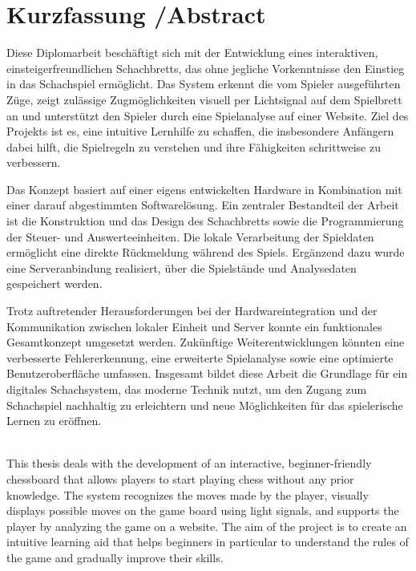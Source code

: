

\chapter*{Kurzfassung /Abstract}
\label{cha:abstract}

Diese Diplomarbeit beschäftigt sich mit der Entwicklung eines interaktiven, einsteigerfreundlichen Schachbretts, 
das ohne jegliche Vorkenntnisse den Einstieg in das Schachspiel ermöglicht. Das System erkennt die vom Spieler 
ausgeführten Züge, zeigt zulässige Zugmöglichkeiten visuell per Lichtsignal auf dem Spielbrett an und unterstützt 
den Spieler durch eine Spielanalyse auf einer Website. Ziel des Projekts ist es, eine intuitive Lernhilfe zu schaffen, 
die insbesondere Anfängern dabei hilft, die Spielregeln zu verstehen und ihre Fähigkeiten schrittweise zu verbessern.

Das Konzept basiert auf einer eigens entwickelten Hardware in Kombination mit einer darauf abgestimmten Softwarelösung. 
Ein zentraler Bestandteil der Arbeit ist die Konstruktion und das Design des Schachbretts sowie die Programmierung der 
Steuer- und Auswerteeinheiten. Die lokale Verarbeitung der Spieldaten ermöglicht eine direkte Rückmeldung während des 
Spiels. Ergänzend dazu wurde eine Serveranbindung realisiert, über die Spielstände und Analysedaten gespeichert werden.

Trotz auftretender Herausforderungen bei der Hardwareintegration und der Kommunikation zwischen lokaler Einheit und 
Server konnte ein funktionales Gesamtkonzept umgesetzt werden. Zukünftige Weiterentwicklungen könnten eine verbesserte 
Fehlererkennung, eine erweiterte Spielanalyse sowie eine optimierte Benutzeroberfläche umfassen. Insgesamt bildet 
diese Arbeit die Grundlage für ein digitales Schachsystem, das moderne Technik nutzt, um den Zugang zum Schachspiel 
nachhaltig zu erleichtern und neue Möglichkeiten für das spielerische Lernen zu eröffnen.   \\ \\

\newpage

This thesis deals with the development of an interactive, beginner-friendly chessboard that allows players to start 
playing chess without any prior knowledge. The system recognizes the moves made by the player, visually displays 
possible moves on the game board using light signals, and supports the player by analyzing the game on a website. 
The aim of the project is to create an intuitive learning aid that helps beginners in particular to understand the 
rules of the game and gradually improve their skills.

